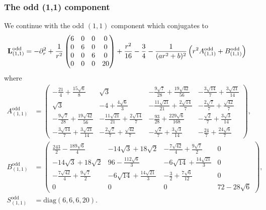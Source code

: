 \documentclass[11pt,reqno]{amsart}
\theoremstyle{remark}
\newcommand{\Lf}{\textup{\textbf{L}}}
\theoremstyle{definition}
\begin{document}
\subsubsection*{The odd (1,1) component}
We continue with the odd $(1,1)$ component which conjugates to
\begin{align*}
    \Lf_{(1,1)}^{\mathrm{odd}}&= -\partial_r^2 +  \frac1{r^2} \begin{pmatrix}
    6 & 0 & 0 & 0 \\
    0 & 6 & 0 & 0 \\
    0 & 0 & 6 & 0 \\
    0 & 0 & 0 & 20 \\
\end{pmatrix}
+\frac{r^2}{16}-\frac 34
- \frac{1}{(ar^2 + b)^2} \left( r^2 A_{(1,1)}^{\mathrm{odd}}+ B_{(1,1)}^{\mathrm{odd}} \right)
\end{align*}
where
\begin{align*}
A_{(1,1)}^{\mathrm{odd}} &= \left(\begin{smallmatrix}- \frac{21}{4} + \frac{15 \sqrt{6}}{8} & \sqrt{3} & - \frac{9 \sqrt{7}}{28} + \frac{19 \sqrt{42}}{56} & - \frac{3 \sqrt{14}}{7} + \frac{3 \sqrt{21}}{14}\\\sqrt{3} & -4 + \frac{4 \sqrt{6}}{3} & - \frac{11 \sqrt{21}}{21} + \frac{2 \sqrt{14}}{7} & - \frac{2 \sqrt{7}}{7} + \frac{\sqrt{42}}{7}\\- \frac{9 \sqrt{7}}{28} + \frac{19 \sqrt{42}}{56} & - \frac{11 \sqrt{21}}{21} + \frac{2 \sqrt{14}}{7} & - \frac{93}{28} + \frac{229 \sqrt{6}}{168} & - \frac{\sqrt{2}}{7} + \frac{3 \sqrt{3}}{14}\\- \frac{3 \sqrt{14}}{7} + \frac{3 \sqrt{21}}{14} & - \frac{2 \sqrt{7}}{7} + \frac{\sqrt{42}}{7} & - \frac{\sqrt{2}}{7} + \frac{3 \sqrt{3}}{14} & - \frac{24}{7} + \frac{24 \sqrt{6}}{7}\end{smallmatrix}\right), & 
\\ 
B_{(1,1)}^{\mathrm{odd}} &= \left(\begin{smallmatrix}\frac{243}{2} - \frac{189 \sqrt{6}}{4} & - 14 \sqrt{3} + 18 \sqrt{2} & - \frac{7 \sqrt{42}}{4} + \frac{9 \sqrt{7}}{2} & 0\\- 14 \sqrt{3} + 18 \sqrt{2} & 96 - \frac{112 \sqrt{6}}{3} & - 6 \sqrt{14} + \frac{14 \sqrt{21}}{3} & 0\\- \frac{7 \sqrt{42}}{4} + \frac{9 \sqrt{7}}{2} & - 6 \sqrt{14} + \frac{14 \sqrt{21}}{3} & - \frac{3}{2} + \frac{7 \sqrt{6}}{12} & 0\\0 & 0 & 0 & 72 - 28 \sqrt{6}\end{smallmatrix}\right), & 
\\
S_{(1,1)}^{\mathrm{odd}} &= \mathrm{diag}(6,6,6,20). &
\end{align*}
\end{document}
